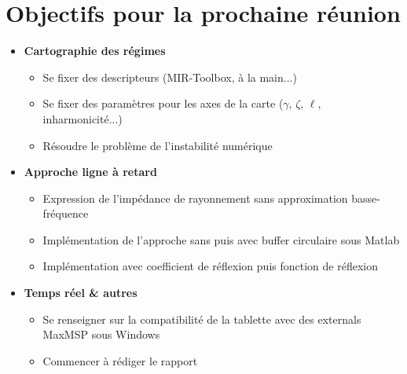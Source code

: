 \documentclass[a4paper, 11pt]{article}
\begin{document}
\section{Objectifs pour la prochaine réunion}
\begin{itemize}
	\item \textbf{Cartographie des régimes}
	\begin{itemize}
		\item Se fixer des descripteurs (MIR-Toolbox, à la main...)
		\item Se fixer des paramètres pour les axes de la carte ($\gamma$, $\zeta$, $\ell$, inharmonicité...)
		\item Résoudre le problème de l'instabilité numérique
	\end{itemize}
	\item \textbf{Approche ligne à retard}
	\begin{itemize}
		\item Expression de l'impédance de rayonnement sans approximation basse-fréquence
		\item Implémentation de l'approche sans puis avec buffer circulaire sous Matlab
		\item Implémentation avec coefficient de réflexion puis fonction de réflexion
	\end{itemize}
	\item \textbf{Temps réel \& autres}
	\begin{itemize}
		\item Se renseigner sur la compatibilité de la tablette avec des externals MaxMSP sous Windows
		\item Commencer à rédiger le rapport
	\end{itemize}
\end{itemize}
\end{document}
